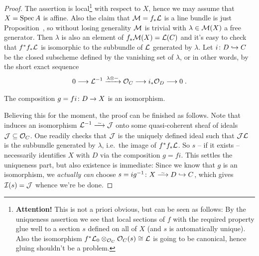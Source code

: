 \documentclass[a4paper,parskip=half,numbers=enddot, DIV=12]{scrreprt}
\begin{document}
\begin{proof}
	The assertion is local\footnote{\textbf{Attention!} This is not a priori obvious, but can be seen as follows: By the uniqueness assertion we see that local sections of $f$ with the required property glue well to a section $s$ defined on all of $X$ (and $s$ is automatically unique). Also the isomorphism $f^*\mathcal{L}_0\otimes_{\mathcal{O}_C}\mathcal{O}_C(s)\cong\mathcal{L}$ is going to be canonical, hence gluing shouldn't be a problem.} with respect to $X$, hence we may assume that $X=\operatorname{Spec} A$ is affine. Also the claim that $\mathcal{M}=f_*\mathcal{L}$ is a line bundle is just Proposition~, so without losing generality $\mathcal{M}$ is trivial with $\lambda\in\mathcal{M}(X)$ a free generator. Then $\lambda$ is also an element of $f_*\mathcal{M}(X)=\mathcal{L}(C)$ and it's easy to check that $f^*f_*\mathcal{L}$ is isomorphic to the subbundle of $\mathcal{L}$ generated by $\lambda$. Let $i\colon D\monomorphism C$ be the closed subscheme defined by the vanishing set of $\lambda$, or in other words, by the short exact sequence
	\begin{align}\lbl{eq:SESforD}
		0\morphism\Ll^{-1}\xrightarrow{\lambda\otimes-}\Oo_C\morphism i_*\Oo_D\morphism 0\;.
	\end{align}
	\begin{claim}
		The composition $g=fi\colon D\morphism X$ is an isomorphism.
	\end{claim}
	Believing this for the moment, the proof can be finished as follows. Note that  induces an isomorphism $\Ll^{-1}\isomorphism\Jj$ onto some quasi-coherent sheaf of ideals $\mathcal{J}\subseteq \mathcal{O}_C$. One readily checks that $\mathcal{J}$ is the uniquely defined ideal such that $\mathcal{J}\mathcal{L}$ is the subbundle generated by $\lambda$, i.e.\ the image of $f^*f_*\mathcal{L}$. So $s$ -- if it exists -- necessarily identifies $X$ with $D$ via the composition $g=fi$. This settles the uniqueness part, but also existence is immediate: Since we know that $g$ is an isomorphism, we \emph{actually can} choose $s=ig^{-1}\colon X\isomorphism D\monomorphism C$, which gives $\mathcal{I}(s)=\mathcal{J}$ whence we're be done.
	

\end{proof}
\end{document}
